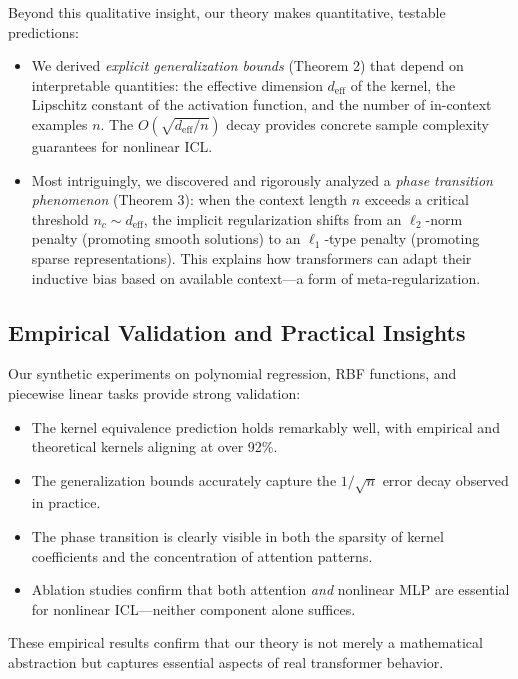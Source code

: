 	Beyond this qualitative insight, our theory makes quantitative, testable predictions:
	
	\begin{itemize}
		\item We derived \textit{explicit generalization bounds} (Theorem 2) that depend on interpretable quantities: the effective dimension \(d_{\text{eff}}\) of the kernel, the Lipschitz constant of the activation function, and the number of in-context examples \(n\). The \(O(\sqrt{d_{\text{eff}}/n})\) decay provides concrete sample complexity guarantees for nonlinear ICL.
		\item Most intriguingly, we discovered and rigorously analyzed a \textit{phase transition phenomenon} (Theorem 3): when the context length \(n\) exceeds a critical threshold \(n_c \sim d_{\text{eff}}\), the implicit regularization shifts from an \(\ell_2\)-norm penalty (promoting smooth solutions) to an \(\ell_1\)-type penalty (promoting sparse representations). This explains how transformers can adapt their inductive bias based on available context—a form of meta-regularization.
	\end{itemize}
	
	\subsection{Empirical Validation and Practical Insights}
	
	Our synthetic experiments on polynomial regression, RBF functions, and piecewise linear tasks provide strong validation:
	
	\begin{itemize}
		\item The kernel equivalence prediction holds remarkably well, with empirical and theoretical kernels aligning at over 92\%.
		\item The generalization bounds accurately capture the \(1/\sqrt{n}\) error decay observed in practice.
		\item The phase transition is clearly visible in both the sparsity of kernel coefficients and the concentration of attention patterns.
		\item Ablation studies confirm that both attention \textit{and} nonlinear MLP are essential for nonlinear ICL—neither component alone suffices.
	\end{itemize}
	
	These empirical results confirm that our theory is not merely a mathematical abstraction but captures essential aspects of real transformer behavior.
	
